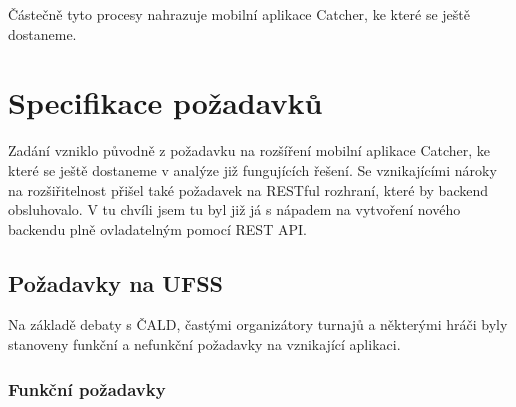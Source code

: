 \documentclass[thesis=B,czech]{FITthesis}[2012/06/26]
\begin{document}
Částečně tyto procesy nahrazuje mobilní aplikace Catcher, ke které se ještě dostaneme.


\chapter{Specifikace požadavků}

Zadání vzniklo původně z požadavku na rozšíření mobilní aplikace Catcher, ke které se ještě
dostaneme v analýze již fungujících řešení. Se vznikajícími nároky na rozšiřitelnost přišel
také požadavek na RESTful rozhraní, které by backend obsluhovalo. V tu chvíli jsem tu byl
již já s nápadem na vytvoření nového backendu plně ovladatelným pomocí REST API.

\section{Požadavky na UFSS}

\indent

Na základě debaty s ČALD, častými organizátory turnajů a některými hráči byly stanoveny
funkční a nefunkční požadavky na vznikající aplikaci.

\subsection{Funkční požadavky}

\end{document}
